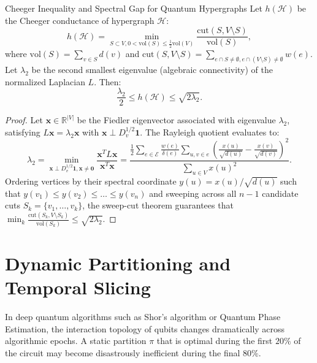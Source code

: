 \begin{theorembox}{Cheeger Inequality and Spectral Gap for Quantum Hypergraphs}
Let $h(\mathcal{H})$ be the Cheeger conductance of hypergraph $\mathcal{H}$:
\begin{equation}
    h(\mathcal{H}) = \min_{S \subset V, 0 < \text{vol}(S) \le \frac{1}{2}\text{vol}(V)} \frac{\text{cut}(S, V \setminus S)}{\text{vol}(S)},
\end{equation}
where $\text{vol}(S) = \sum_{v \in S} d(v)$ and $\text{cut}(S, V \setminus S) = \sum_{e \cap S \neq \emptyset, e \cap (V \setminus S) \neq \emptyset} w(e)$. Let $\lambda_2$ be the second smallest eigenvalue (algebraic connectivity) of the normalized Laplacian $L$. Then:
\begin{equation}
    \frac{\lambda_2}{2} \le h(\mathcal{H}) \le \sqrt{2 \lambda_2}.
    \label{eq:hypergraph_cheeger_bound}
\end{equation}
\end{theorembox}

\begin{proof}
Let $\bm{x} \in \mathbb{R}^{|V|}$ be the Fiedler eigenvector associated with eigenvalue $\lambda_2$, satisfying $L \bm{x} = \lambda_2 \bm{x}$ with $\bm{x} \perp D_v^{1/2} \bm{1}$. The Rayleigh quotient evaluates to:
\begin{equation}
    \lambda_2 = \min_{\bm{x} \perp D_v^{1/2} \bm{1}, \bm{x} \neq \bm{0}} \frac{\bm{x}^T L \bm{x}}{\bm{x}^T \bm{x}} = \frac{\frac{1}{2}\sum_{e \in \mathcal{E}} \frac{w(e)}{\delta(e)} \sum_{u, v \in e} \left( \frac{x(u)}{\sqrt{d(u)}} - \frac{x(v)}{\sqrt{d(v)}} \right)^2}{\sum_{u \in V} x(u)^2}.
\end{equation}
Ordering vertices by their spectral coordinate $y(u) = x(u) / \sqrt{d(u)}$ such that $y(v_1) \le y(v_2) \le \dots \le y(v_n)$ and sweeping across all $n-1$ candidate cuts $S_k = \{v_1, \dots, v_k\}$, the sweep-cut theorem guarantees that $\min_k \frac{\text{cut}(S_k, V \setminus S_k)}{\text{vol}(S_k)} \le \sqrt{2 \lambda_2}$.
\end{proof}

\section{Dynamic Partitioning and Temporal Slicing}
\label{sec:dynamic_partitioning}

In deep quantum algorithms such as Shor's algorithm or Quantum Phase Estimation, the interaction topology of qubits changes dramatically across algorithmic epochs. A static partition $\pi$ that is optimal during the first $20\%$ of the circuit may become disastrously inefficient during the final $80\%$.

